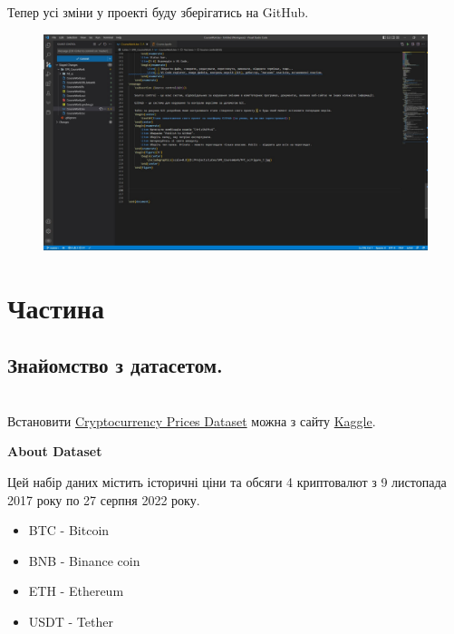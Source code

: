 \documentclass[a4paper,12pt]{article}
\begin{document}
\newpage
    Тепер усі зміни у проекті буду зберігатись на GitHub.
    \begin{figure}[h!]
        \begin{center}
            \includegraphics[scale=0.35]{Prt sc/Figure_8.jpg}
        \end{center}
    \end{figure}





\newpage
    \section{Частина}
    \subsection {Знайомство з датасетом.}
    \hrulefill \\
    Встановити \href{https://www.kaggle.com/datasets/thedevastator/get-your-game-on-metacritic-recommendations-and}{Cryptocurrency Prices Dataset} можна з сайту 
    \href{https://www.kaggle.com/}{Kaggle}.
    \begin{center}
        \textbf{About Dataset}
    \end{center}
    Цей набір даних містить історичні ціни та обсяги 4 криптовалют з 9 листопада 2017 року по 27 серпня 2022 року.
    \begin{itemize}
        \item BTC - Bitcoin
        \item BNB - Binance coin
        \item ETH - Ethereum
        \item USDT - Tether
    \end{itemize}
\end{document}
